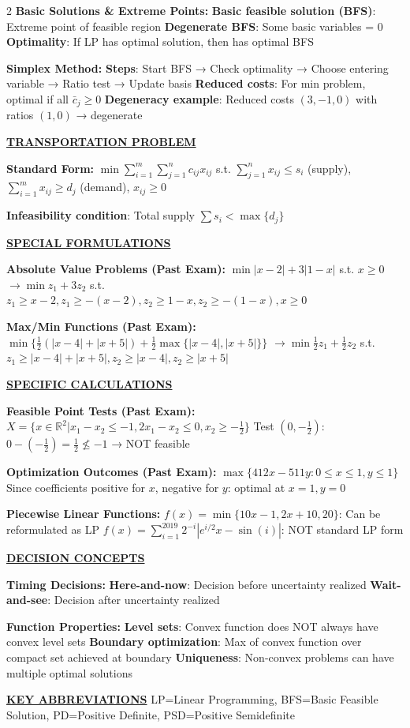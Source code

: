 \documentclass[10pt,a4paper]{article}
\newcommand{\mysection}[1]{\vspace{3pt}\textbf{\underline{#1}}\vspace{2pt}}
\newcommand{\mysubsection}[1]{\vspace{2pt}\textbf{#1:}\vspace{1pt}}
\begin{document}
\begin{multicols}{2}
\mysubsection{Basic Solutions \& Extreme Points}
\textbf{Basic feasible solution (BFS)}: Extreme point of feasible region
\textbf{Degenerate BFS}: Some basic variables = 0
\textbf{Optimality}: If LP has optimal solution, then has optimal BFS

\mysubsection{Simplex Method}
\textbf{Steps}: Start BFS → Check optimality → Choose entering variable → Ratio test → Update basis
\textbf{Reduced costs}: For min problem, optimal if all $\bar{c}_j \geq 0$
\textbf{Degeneracy example}: Reduced costs $(3,-1,0)$ with ratios $(1,0)$ → degenerate

\mysection{TRANSPORTATION PROBLEM}

\mysubsection{Standard Form}
$\min \sum_{i=1}^m \sum_{j=1}^n c_{ij}x_{ij}$
s.t. $\sum_{j=1}^n x_{ij} \leq s_i$ (supply), $\sum_{i=1}^m x_{ij} \geq d_j$ (demand), $x_{ij} \geq 0$

\textbf{Infeasibility condition}: Total supply $\sum s_i < \max\{d_j\}$

\mysection{SPECIAL FORMULATIONS}

\mysubsection{Absolute Value Problems (Past Exam)}
$\min |x-2| + 3|1-x|$ s.t. $x \geq 0$
$\rightarrow \min z_1 + 3z_2$ s.t. $z_1 \geq x-2, z_1 \geq -(x-2), z_2 \geq 1-x, z_2 \geq -(1-x), x \geq 0$

\mysubsection{Max/Min Functions (Past Exam)}
$\min\{\frac{1}{2}(|x-4| + |x+5|) + \frac{1}{2}\max\{|x-4|,|x+5|\}\}$
$\rightarrow \min \frac{1}{2}z_1 + \frac{1}{2}z_2$ s.t. $z_1 \geq |x-4| + |x+5|, z_2 \geq |x-4|, z_2 \geq |x+5|$

\mysection{SPECIFIC CALCULATIONS}

\mysubsection{Feasible Point Tests (Past Exam)}
$X = \{x \in \mathbb{R}^2 | x_1 - x_2 \leq -1, 2x_1 - x_2 \leq 0, x_2 \geq -\frac{1}{2}\}$
Test $(0,-\frac{1}{2})$: $0-(-\frac{1}{2}) = \frac{1}{2} \not\leq -1$ → NOT feasible

\mysubsection{Optimization Outcomes (Past Exam)}
$\max\{412x - 511y : 0 \leq x \leq 1, y \leq 1\}$
Since coefficients positive for $x$, negative for $y$: optimal at $x=1, y=0$

\mysubsection{Piecewise Linear Functions}
$f(x) = \min\{10x-1, 2x+10, 20\}$: Can be reformulated as LP
$f(x) = \sum_{i=1}^{2019} 2^{-i}|e^{i/2}x - \sin(i)|$: NOT standard LP form

\mysection{DECISION CONCEPTS}

\mysubsection{Timing Decisions}
\textbf{Here-and-now}: Decision before uncertainty realized
\textbf{Wait-and-see}: Decision after uncertainty realized

\mysubsection{Function Properties}
\textbf{Level sets}: Convex function does NOT always have convex level sets
\textbf{Boundary optimization}: Max of convex function over compact set achieved at boundary
\textbf{Uniqueness}: Non-convex problems can have multiple optimal solutions

\mysection{KEY ABBREVIATIONS}
LP=Linear Programming, BFS=Basic Feasible Solution, PD=Positive Definite, PSD=Positive Semidefinite

\end{multicols}
\end{document}
